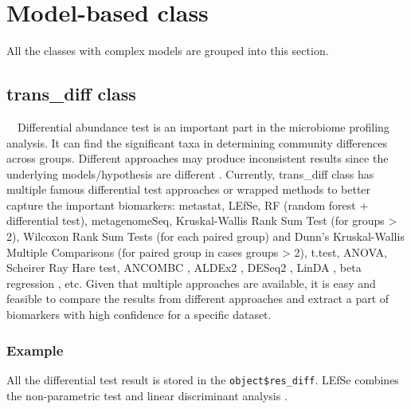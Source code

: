 \documentclass[
]{book}
\begin{document}
\hypertarget{model-based-class}{%
\chapter{Model-based class}\label{model-based-class}}

All the classes with complex models are grouped into this section.

\hypertarget{trans_diff-class}{%
\section{trans\_diff class}\label{trans_diff-class}}

　Differential abundance test is an important part in the microbiome profiling analysis.
It can find the significant taxa in determining community differences across groups.
Different approaches may produce inconsistent results since the underlying models/hypothesis are different \citep{Nearing_Microbiome_2022}.
Currently, trans\_diff class has multiple famous differential test approaches or wrapped methods to better capture the important biomarkers:
metastat\citep{White_Statistical_2009}, LEfSe\citep{Segata_Metagenomic_2011}, RF (random forest + differential test), metagenomeSeq\citep{Paulson_Differential_2013},
Kruskal-Wallis Rank Sum Test (for groups \textgreater{} 2), Wilcoxon Rank Sum Tests (for each paired group) and
Dunn's Kruskal-Wallis Multiple Comparisons (for paired group in cases groups \textgreater{} 2),
t.test, ANOVA, Scheirer Ray Hare test,
ANCOMBC \citep{Lin_Analysis_2020}, ALDEx2 \citep{Fernandes_Unifying_2014},
DESeq2 \citep{Michael_Moderated_2014}, LinDA \citep{LinDA_Zhou_2022}, beta regression \citep{Betaregression_2010}, etc.
Given that multiple approaches are available,
it is easy and feasible to compare the results from different approaches and extract a part of biomarkers with high confidence for a specific dataset.

\hypertarget{example-4}{%
\subsection{Example}\label{example-4}}

All the differential test result is stored in the \texttt{object\$res\_diff}.
LEfSe combines the non-parametric test and linear discriminant analysis \citep{Segata_Metagenomic_2011}.
\end{document}
